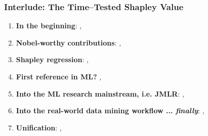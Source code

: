 \documentclass[11pt,
               aspectratio=169,
               hyperref={colorlinks}
               ]{beamer}
\begin{document}
			\begin{frame}
		
				\frametitle{Interlude: The Time--Tested Shapley Value}		
			
				\begin{enumerate}
				
					\item \textbf{In the beginning}: , 
					\item \textbf{Nobel-worthy contributions}: , 
					\item \textbf{Shapley regression}: , 
					\item \textbf{First reference in ML?} ,  	
					\item \textbf{Into the ML research mainstream, i.e. JMLR}: , 
					\item \textbf{Into the real-world data mining workflow ... \textit{finally}}: , 	
					\item \textbf{Unification}: , 	
				
				\end{enumerate}
			
			\end{frame}
			
\end{document}
